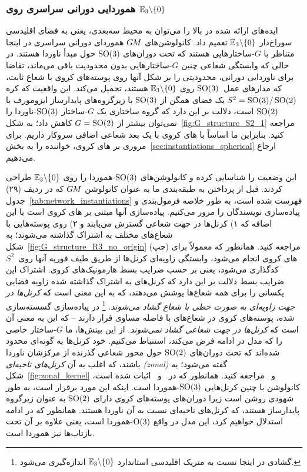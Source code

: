 

\subsubsection*{هموردایی دورانی سراسری روی $\mathbb{E}_3 \backslash \{0\}$}
\label{sec:punctured_euclidean_3dim}

ایده‌های ارائه شده در بالا را می‌توان به محیط سه‌بعدی، یعنی به فضای اقلیدسی سوراخ‌دار $\mathbb{E}_3 \backslash \{0\}$ تعمیم داد.
کانولوشن‌های $G\mkern-1.4muM$ هموردای دورانی سراسری در اینجا متناظر با $G$-ساختارهایی هستند که تحت دوران‌های $\operatorname{SO}(3)$ حول مبدأ ناوردا هستند.
در حالی که وابستگی شعاعی چنین $G$-ساختارهایی بدون محدودیت باقی می‌ماند، تقاضا برای ناوردایی دورانی، محدودیتی را بر شکل آنها روی پوسته‌های کروی با شعاع ثابت، که مدارهای عمل~$\operatorname{SO}(3)$ روی $\mathbb{E}_3 \backslash \{0\}$ هستند، تحمیل می‌کند.
این واقعیت که کره $S^2 = \operatorname{SO}(3)/\operatorname{SO}(2)$ یک فضای همگن از $\operatorname{SO}(3)$ با زیرگروه‌های پایدارساز ایزومورف با $\operatorname{SO}(2)$ است، دلالت بر این دارد که گروه ساختاری یک $G$-ساختار $\operatorname{SO}(3)$-ناوردا را نمی‌توان بیشتر از $G=\operatorname{SO}(2)$ کاهش داد؛ به شکل~\ref{fig:G_structure_S2_1} مراجعه کنید.
بنابراین ما اساساً با های کروی با یک بعد شعاعی اضافی سروکار داریم.
برای مروری بر های کروی، خواننده را به بخش~\ref{sec:instantiations_spherical} ارجاع می‌دهیم.


\citet{ramasinghe2019representation} این وضعیت را شناسایی کرده و کانولوشن‌های $\operatorname{SO}(3)$-هموردا را روی $\mathbb{E}_3 \backslash \{0\}$ طراحی کردند.
قبل از پرداختن به طبقه‌بندی ما به عنوان کانولوشن $G\mkern-1.4muM$ که در ردیف (۲۹) جدول~\ref{tab:network_instantiations} فهرست شده است، به طور خلاصه فرمول‌بندی و پیاده‌سازی نویسندگان را مرور می‌کنیم.
پیاده‌سازی آنها مبتنی بر های کروی است با این اضافه که
۱) کرنل‌ها در جهت شعاعی گسترش می‌یابند و
۲) روی پوسته‌هایی با شعاع‌های مختلف به اشتراک گذاشته می‌شوند؛ به شکل~\ref{fig:G_structure_R3_no_origin} (چپ) مراجعه کنید.
همانطور که معمولاً برای های کروی انجام می‌شود، وابستگی زاویه‌ای کرنل‌ها از طریق طیف فوریه آنها روی~$S^2$ کدگذاری می‌شود، یعنی بر حسب ضرایب بسط هارمونیک‌های کروی.
اشتراک این ضرایب بسط دلالت بر این دارد که کرنل‌های به اشتراک گذاشته شده زاویه فضایی یکسانی را برای همه شعاع‌ها پوشش می‌دهند، که به این معنی است که \emph{کرنل‌ها در جهت زاویه‌ای به صورت خطی با شعاع گشاد می‌شوند}.%
\footnote{
	گشادی در اینجا نسبت به متریک اقلیدسی استاندارد $\mathbb{E}_3 \backslash \{0\}$ اندازه‌گیری می‌شود.
}
در پیاده‌سازی گسسته‌سازی شده، پوسته‌های کروی در شعاع‌های با فاصله مساوی قرار دارند -- که این به معنی آن است که \emph{کرنل‌ها در جهت شعاعی گشاد نمی‌شوند}.
از این بینش‌ها، ما $G$-ساختار خاصی را که مدل در ادامه فرض می‌کند، استنباط می‌کنیم.
خود کرنل‌ها به گونه‌ای محدود شده‌اند که تحت دوران‌های $\operatorname{SO}(2)$ حول محور شعاعی گذرنده از مرکزشان ناوردا باشند، که اغلب به آن \emph{کرنل‌های ناحیه‌ای (zonal)} گفته می‌شود؛
به شکل~\ref{fig:zonal_kernel} و~\cite{esteves2018zonalSpherical} مراجعه کنید.
همانطور که در~\cite{esteves2018zonalSpherical} و~\cite{ramasinghe2019representation} اثبات شده است، کانولوشن با چنین کرنل‌هایی $\operatorname{SO}(3)$-هموردا است.
اینکه این مورد برقرار است، به طور شهودی روشن است زیرا دوران‌های پوسته‌های کروی دارای $\operatorname{SO}(2)$ به عنوان زیرگروه پایدارساز هستند، که کرنل‌های ناحیه‌ای نسبت به آن ناوردا هستند.
همانطور که در ادامه استدلال خواهیم کرد، این مدل در واقع $\operatorname{O}(3)$-هموردا است، یعنی علاوه بر آن تحت بازتاب‌ها نیز هموردا است.

